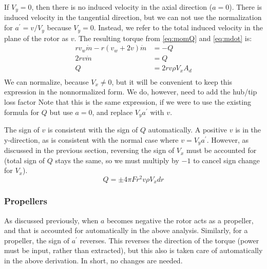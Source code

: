 If $V_y = 0$, then there is no induced velocity in the axial direction ($a = 0$).  There is induced velocity in the tangential direction, but we can not use the normalization for $a^\prime = v/V_y$ because $V_y = 0$.  Instead, we refer to the total induced velocity in the plane of the rotor as $v$.  The resulting torque from \cref{eq:momQ} and \cref{eq:mdot} is:
\begin{equation}
    \begin{aligned}
        r v_w \dot{m} - r (v_w + 2 v) \dot{m} &= -Q\\
        2 r v \dot{m} &= Q\\
        Q &= 2 r v \rho V_x A_d\\
    \end{aligned}
\end{equation}
We can normalize, because $V_x \ne 0$, but it will be convenient to keep this expression in the nonnormalized form.  We do, however, need to add the hub/tip loss factor
Note that this is the same expression, if we were to use the existing formula for $Q$ but use $a = 0$, and replace $V_y a^\prime$ with $v$.

The sign of $v$ is consistent with the sign of $Q$ automatically.  A positive $v$ is in the y-direction, as is consistent with the normal case where $v = V_y a^\prime$.  However, as discussed in the previous section, reversing the sign of $V_x$ must be accounted for (total sign of $Q$ stays the same, so we must multiply by $-1$ to cancel sign change for $V_x$).
\begin{equation}
    Q = \pm 4 \pi F r^2 v \rho V_x dr
\end{equation}



\subsubsection{Propellers}

As discussed previously, when $a$ becomes negative the rotor acts as a propeller, and that is accounted for automatically in the above analysis.  Similarly, for a propeller, the sign of $a^\prime$ reverses.  This reverses the direction of the torque (power must be input, rather than extracted), but this also is taken care of automatically in the above derivation.  In short, no changes are needed.


